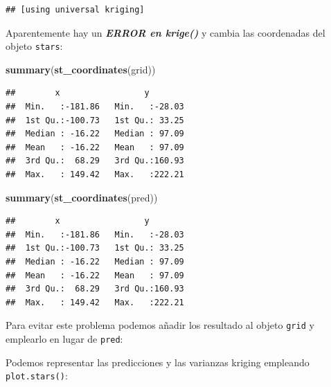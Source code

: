 \documentclass[
]{book}
\newenvironment{Shaded}{\begin{snugshade}}{\end{snugshade}}
\newcommand{\FunctionTok}[1]{\textcolor[rgb]{0.13,0.29,0.53}{\textbf{#1}}}
\newcommand{\NormalTok}[1]{#1}
\newcommand{\OtherTok}[1]{\textcolor[rgb]{0.56,0.35,0.01}{#1}}
\newcommand{\SpecialCharTok}[1]{\textcolor[rgb]{0.81,0.36,0.00}{\textbf{#1}}}
\theoremstyle{break}
\theoremstyle{definition}
\theoremstyle{definition}
\theoremstyle{definition}
\theoremstyle{definition}
\theoremstyle{remark}
\begin{document}
\begin{verbatim}
## [using universal kriging]
\end{verbatim}

Aparentemente hay un \textbf{\emph{ERROR en krige()}} y cambia las coordenadas del objeto \texttt{stars}:

\begin{Shaded}
\begin{Highlighting}[]
\FunctionTok{summary}\NormalTok{(}\FunctionTok{st\_coordinates}\NormalTok{(grid))}
\end{Highlighting}
\end{Shaded}

\begin{verbatim}
##        x                 y         
##  Min.   :-181.86   Min.   :-28.03  
##  1st Qu.:-100.73   1st Qu.: 33.25  
##  Median : -16.22   Median : 97.09  
##  Mean   : -16.22   Mean   : 97.09  
##  3rd Qu.:  68.29   3rd Qu.:160.93  
##  Max.   : 149.42   Max.   :222.21
\end{verbatim}

\begin{Shaded}
\begin{Highlighting}[]
\FunctionTok{summary}\NormalTok{(}\FunctionTok{st\_coordinates}\NormalTok{(pred))}
\end{Highlighting}
\end{Shaded}

\begin{verbatim}
##        x                 y         
##  Min.   :-181.86   Min.   :-28.03  
##  1st Qu.:-100.73   1st Qu.: 33.25  
##  Median : -16.22   Median : 97.09  
##  Mean   : -16.22   Mean   : 97.09  
##  3rd Qu.:  68.29   3rd Qu.:160.93  
##  Max.   : 149.42   Max.   :222.21
\end{verbatim}

Para evitar este problema podemos añadir los resultado al objeto \texttt{grid} y emplearlo en lugar de \texttt{pred}:

\begin{Shaded}
\end{Shaded}

Podemos representar las predicciones y las varianzas kriging empleando \texttt{plot.stars()}:
\end{document}
